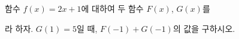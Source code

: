 함수 $f(x)=2x+1$에 대하여 두 함수 $F(x)$, $G(x)$를 \par\smallskip{}\par\smallskip{}\par\smallskip\noindent 라 하자. $G(1)=5$일 때, $F(-1)+G(-1)$의 값을 구하시오.
